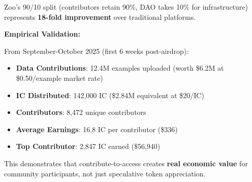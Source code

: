Zoo's 90/10 split (contributors retain 90\%, DAO takes 10\% for infrastructure) represents \textbf{18-fold improvement} over traditional platforms.

\textbf{Empirical Validation:}

From September-October 2025 (first 6 weeks post-airdrop):
\begin{itemize}
\item \textbf{Data Contributions}: 12.4M examples uploaded (worth \$6.2M at \$0.50/example market rate)
\item \textbf{IC Distributed}: 142,000 IC (\$2.84M equivalent at \$20/IC)
\item \textbf{Contributors}: 8,472 unique contributors
\item \textbf{Average Earnings}: 16.8 IC per contributor (\$336)
\item \textbf{Top Contributor}: 2,847 IC earned (\$56,940)
\end{itemize}

This demonstrates that contribute-to-access creates \textbf{real economic value} for community participants, not just speculative token appreciation.

